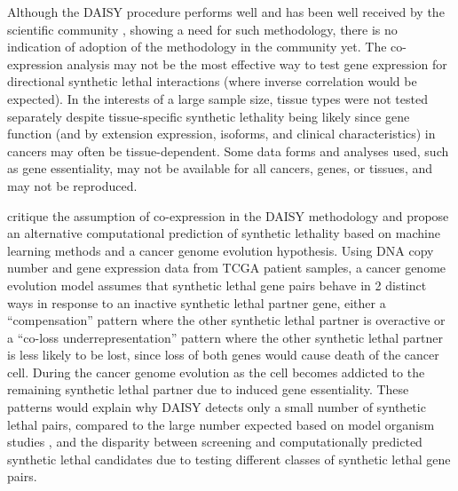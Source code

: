 Although the DAISY procedure performs well and has been well received by the scientific community \citep{Crunkhorn2014, Lokody2014, Ryan2014}, showing a need for such methodology, there is no indication of adoption of the methodology in the community yet. The co-expression analysis may not be the most effective way to test gene expression for directional synthetic lethal interactions (where inverse correlation would be expected). In the interests of a large sample size, tissue types were not tested separately despite tissue-specific synthetic lethality being likely since gene function (and by extension expression, isoforms, and clinical characteristics) in cancers may often be tissue-dependent. Some data forms and analyses used, such as gene essentiality, may not be available for all cancers, genes, or tissues, and may not be reproduced.  

\citet{Lu2015} critique the assumption of co-expression in the DAISY methodology and propose an alternative computational prediction of synthetic lethality based on machine learning methods and a cancer genome evolution hypothesis. Using DNA copy number and gene expression data from TCGA patient samples, a cancer genome evolution model assumes that synthetic lethal gene pairs behave in 2 distinct ways in response to an inactive synthetic lethal partner gene, either a ``compensation'' pattern where the other synthetic lethal partner is overactive or a ``co-loss underrepresentation'' pattern where the other synthetic lethal partner is less likely to be lost, since loss of both genes would cause death of the cancer cell. During the cancer genome evolution as the cell becomes addicted to the remaining synthetic lethal partner due to induced gene essentiality. These patterns would explain why DAISY detects only a small number of synthetic lethal pairs, compared to the large number expected based on model organism studies \citep{Boone2007}, and the disparity between screening and computationally predicted synthetic lethal candidates due to testing different classes of synthetic lethal gene pairs. 

